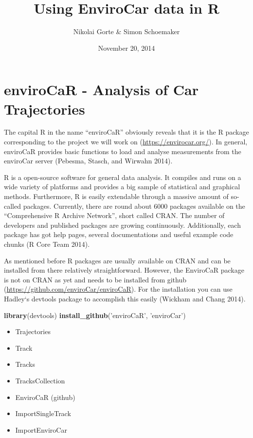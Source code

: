 \documentclass[]{article}
\title{Using EnviroCar data in R}
\author{Nikolai Gorte \& Simon Schoemaker}
\date{November 20, 2014}
\newenvironment{Shaded}{\begin{snugshade}}{\end{snugshade}}
\newcommand{\KeywordTok}[1]{\textcolor[rgb]{0.13,0.29,0.53}{\textbf{{#1}}}}
\newcommand{\StringTok}[1]{\textcolor[rgb]{0.31,0.60,0.02}{{#1}}}
\newcommand{\NormalTok}[1]{{#1}}
\begin{document}
\maketitle


\section{enviroCaR - Analysis of Car
Trajectories}\label{envirocar---analysis-of-car-trajectories}

The capital R in the name ``enviroCaR'' obviously reveals that it is the
R package corresponding to the project we will work on
(\url{https://envirocar.org/}). In general, enviroCaR provides basic
functions to load and analyse measurements from the enviroCar server
(Pebesma, Stasch, and Wirwahn 2014).

R is a open-source software for general data analysis. It compiles and
runs on a wide variety of platforms and provides a big sample of
statistical and graphical methods. Furthermore, R is easily extendable
through a massive amount of so-called packages. Currently, there are
round about 6000 packages available on the ``Comprehensive R Archive
Network'', short called CRAN. The number of developers and published
packages are growing continuously. Additionally, each package has got
help pages, several documentations and useful example code chunks (R
Core Team 2014).

As mentioned before R packages are usually available on CRAN and can be
installed from there relatively straightforward. However, the EnviroCaR
package is not on CRAN as yet and needs to be installed from github
(\url{https://github.com/enviroCar/enviroCaR}). For the installation you
can use Hadley`s devtools package to accomplish this easily (Wickham and
Chang 2014).

\begin{Shaded}
\begin{Highlighting}[]
\KeywordTok{library}\NormalTok{(devtools)}
\KeywordTok{install_github}\NormalTok{(}\StringTok{'enviroCaR'}\NormalTok{, }\StringTok{'enviroCar'}\NormalTok{)}
\end{Highlighting}
\end{Shaded}

\begin{itemize}
\itemsep1pt\parskip0pt
\item
  Trajectories
\item
  Track
\item
  Tracks
\item
  TracksCollection
\item
  EnviroCaR (github)
\item
  ImportSingleTrack
\item
  ImportEnviroCar
\end{itemize}
\end{document}
